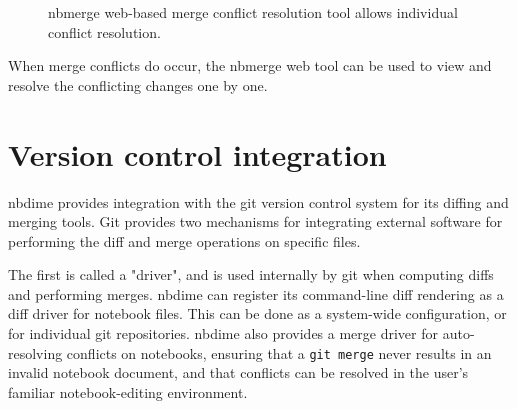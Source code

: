 \documentclass{deliverablereport}
\begin{document}
\begin{figure}
    \center
    \caption{nbmerge web-based merge conflict resolution tool allows individual conflict resolution.}
    \label{fig:nbmerge-web}
\end{figure}

When merge conflicts do occur, the nbmerge web tool can be used to view and resolve the conflicting changes one by one.



\section{Version control integration} %
\label{sub:version_control_integration}

nbdime provides integration with the git version control system for its diffing and merging tools.
Git provides two mechanisms for integrating external software for
performing the diff and merge operations on specific files.

The first is called a "driver", and is used internally by git when computing diffs and performing merges. nbdime can register its command-line diff rendering as a diff driver for notebook files.
This can be done as a system-wide configuration, or for individual git repositories.
nbdime also provides a merge driver for auto-resolving conflicts on notebooks,
ensuring that a \texttt{git merge} never results in an invalid notebook document,
and that conflicts can be resolved in the user's familiar notebook-editing environment.
\end{document}
